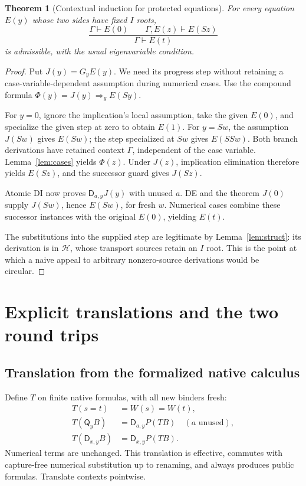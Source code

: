 \documentclass[11pt,letterpaper]{article}
\newtheorem{theorem}{Theorem}[section]
\theoremstyle{definition}\newtheorem{definition}[theorem]{Definition}
\theoremstyle{remark}\newtheorem{remark}[theorem]{Remark}
\newcommand{\D}{\mathsf D}\newcommand{\Q}{\mathsf Q}
\newcommand{\Hcal}{\mathcal H}\newcommand{\Kcal}{\mathcal K}
\begin{document}
\begin{theorem}[Contextual induction for protected equations]\label{thm:ei}
For every equation \(E(y)\) whose two sides have fixed \(I\) roots,
\[
 \frac{\Gamma\vdash E(0)\qquad\Gamma,E(z)\vdash E(Sz)}
      {\Gamma\vdash E(t)}
 \tag{PEI}\label{eq:pei}
\]
is admissible, with the usual eigenvariable condition.
\end{theorem}
\begin{proof}
Put \(J(y)=G_yE(y)\). We need its progress step without retaining
a case-variable-dependent assumption during numerical cases.
Use the compound formula
\(\Phi(y)=J(y)\Rightarrow_g E(Sy)\).

For \(y=0\), ignore the implication's local assumption, take the
given \(E(0)\), and specialize the given step at zero to obtain
\(E(1)\). For \(y=Sw\), the assumption \(J(Sw)\) gives
\(E(Sw)\); the step specialized at \(Sw\) gives \(E(SSw)\).
Both branch derivations have retained context \(\Gamma\), independent
of the case variable. Lemma~\ref{lem:cases} yields \(\Phi(z)\).
Under \(J(z)\), implication elimination therefore yields \(E(Sz)\),
and the successor guard gives \(J(Sz)\).

Atomic DI now proves \(\D_{a,y}J(y)\) with unused \(a\).
DE and the theorem \(J(0)\) supply \(J(Sw)\), hence \(E(Sw)\),
for fresh \(w\). Numerical cases combine these successor instances
with the original \(E(0)\), yielding \(E(t)\).

The substitutions into the supplied step are legitimate by
Lemma~\ref{lem:struct}: its derivation is in \(\Hcal\), whose
transport sources retain an \(I\) root. This is the point at which a
naive appeal to arbitrary nonzero-source derivations would be circular.
\end{proof}

\section{Explicit translations and the two round trips}\label{sec:translations}

\subsection{Translation from the formalized native calculus}

Define \(T\) on finite native formulas, with all new binders fresh:
\begin{align*}
 T(s=t)&=W(s)=W(t),\\
 T(\Q_y B)&=\D_{a,y}P(TB)\quad(a\text{ unused}),\\
 T(\D_{x,y}B)&=\D_{x,y}P(TB).
\end{align*}
Numerical terms are unchanged. This translation is effective, commutes
with capture-free numerical substitution up to renaming, and always
produces public formulas. Translate contexts pointwise.
\end{document}
